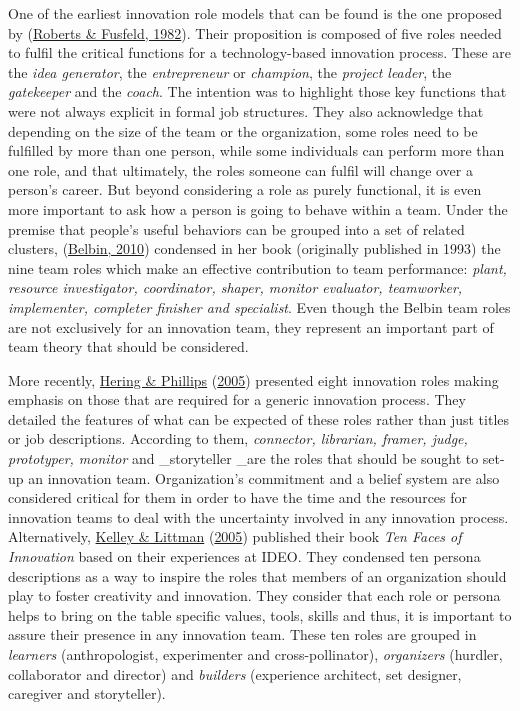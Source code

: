 \documentclass[]{elsarticle} %
\begin{document}
One of the earliest innovation role models that can be found is the one
proposed by (\protect\hyperlink{ref-Roberts1982}{Roberts \& Fusfeld,
1982}). Their proposition is composed of five roles needed to fulfil the
critical functions for a technology-based innovation process. These are
the \emph{idea generator}, the \emph{entrepreneur} or \emph{champion},
the \emph{project leader}, the \emph{gatekeeper} and the \emph{coach}.
The intention was to highlight those key functions that were not always
explicit in formal job structures. They also acknowledge that depending
on the size of the team or the organization, some roles need to be
fulfilled by more than one person, while some individuals can perform
more than one role, and that ultimately, the roles someone can fulfil
will change over a person's career. But beyond considering a role as
purely functional, it is even more important to ask how a person is
going to behave within a team. Under the premise that people's useful
behaviors can be grouped into a set of related clusters,
(\protect\hyperlink{ref-Belbin2010}{Belbin, 2010}) condensed in her book
(originally published in 1993) the nine team roles which make an
effective contribution to team performance: \emph{plant, resource
investigator, coordinator, shaper, monitor evaluator, teamworker,
implementer, completer finisher and specialist}. Even though the Belbin
team roles are not exclusively for an innovation team, they represent an
important part of team theory that should be considered.

More recently, \protect\hyperlink{ref-Hering2005}{Hering \& Phillips}
(\protect\hyperlink{ref-Hering2005}{2005}) presented eight innovation
roles making emphasis on those that are required for a generic
innovation process. They detailed the features of what can be expected
of these roles rather than just titles or job descriptions. According to
them, \emph{connector, librarian, framer, judge, prototyper, monitor}
and \_storyteller \_are the roles that should be sought to set-up an
innovation team. Organization's commitment and a belief system are also
considered critical for them in order to have the time and the resources
for innovation teams to deal with the uncertainty involved in any
innovation process. Alternatively,
\protect\hyperlink{ref-Kelley2005}{Kelley \& Littman}
(\protect\hyperlink{ref-Kelley2005}{2005}) published their book
\emph{Ten Faces of Innovation} based on their experiences at IDEO. They
condensed ten persona descriptions as a way to inspire the roles that
members of an organization should play to foster creativity and
innovation. They consider that each role or persona helps to bring on
the table specific values, tools, skills and thus, it is important to
assure their presence in any innovation team. These ten roles are
grouped in \emph{learners} (anthropologist, experimenter and
cross-pollinator), \emph{organizers} (hurdler, collaborator and
director) and \emph{builders} (experience architect, set designer,
caregiver and storyteller).
\end{document}
